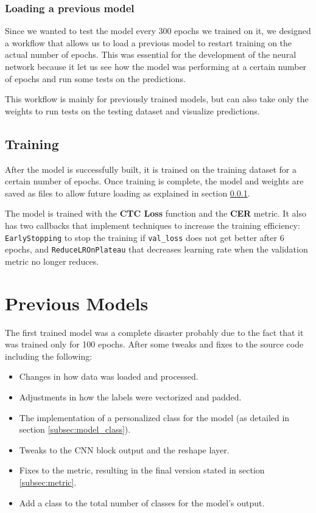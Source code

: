 \documentclass[11pt,letterpaper]{article}
\begin{document}
	\subsubsection{Loading a previous model} \label{subsubsec:loading_model}
	Since we wanted to test the model every 300 epochs we trained on it, we designed a workflow that allows us to load a previous model to restart training on the actual number of epochs. This was essential for the development of the neural network because it let us see how the model was performing at a certain number of epochs and run some tests on the predictions.
	
	This workflow is mainly for previously trained models, but can also take only the weights to run tests on the testing dataset and visualize predictions.
	
	\subsection{Training}
	After the model is successfully built, it is trained on the training dataset for a certain number of epochs. Once training is complete, the model and weights are saved as files to allow future loading as explained in section \ref{subsubsec:loading_model}.
	
	The model is trained with the \textbf{CTC Loss} function and the \textbf{CER} metric. It also has two callbacks that implement techniques to increase the training efficiency: \texttt{EarlyStopping} to stop the training if \texttt{val\_loss} does not get better after 6 epochs, and \texttt{ReduceLROnPlateau} that decreases learning rate when the validation metric no longer reduces.
	
	\section{Previous Models}
	The first trained model was a complete disaster probably due to the fact that it was trained only for 100 epochs. After some tweaks and fixes to the source code including the following:
	\begin{itemize}
		\item Changes in how data was loaded and processed.
		\item Adjustments in how the labels were vectorized and padded.
		\item The implementation of a personalized class for the model (as detailed in section \ref{subsec:model_class}).
		\item Tweaks to the CNN block output and the reshape layer.
		\item Fixes to the metric, resulting in the final version stated in section \ref{subsec:metric}.
		\item Add a class to the total number of classes for the model's output.
	\end{itemize}
	
\end{document}
